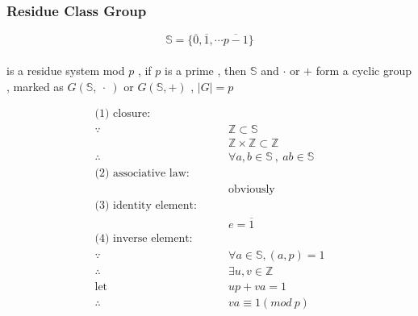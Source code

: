 \documentclass{ctexart}
\begin{document}
\vspace{12 pt}
\subsubsection{Residue Class Group}
\[\mathbb{S}=\{\overline{0},\overline{1},\cdots \overline{p-1}\}\]
\\is a residue system mod \(p\) , if \(p\) is a prime , then \(\mathbb{S}\) and \(\cdot\) or \(+\) form a cyclic group , marked as \(G(\mathbb{S},\ \cdot\ )\) or \(G(\mathbb{S}, +)\) , \(\vert G\vert =p\)

\vspace{12 pt}
\begin{align*}
\text{(1) closure:}\qquad &\\
\because &\mathbb{Z}\subset \mathbb{S}\\
&\mathbb{Z}\times\mathbb{Z}\subset\mathbb{Z}\\
\therefore &\forall a,b\in \mathbb{S}\ ,\ ab\in\mathbb{S}\\
\text{(2) associative law:}\qquad &\\
&\text{obviously}\\
\text{(3) identity element:}\qquad &\\
&e=\overline{1}\\
\text{(4) inverse element:}\qquad &\\
\because &\forall a \in \mathbb{S},(a,p)=1\\
\therefore &\exists u,v \in\mathbb{Z}\\
\text{let}\quad& up+va=1\\
\therefore & va\equiv 1(mod\ p)
\end{align*}
\end{document}
